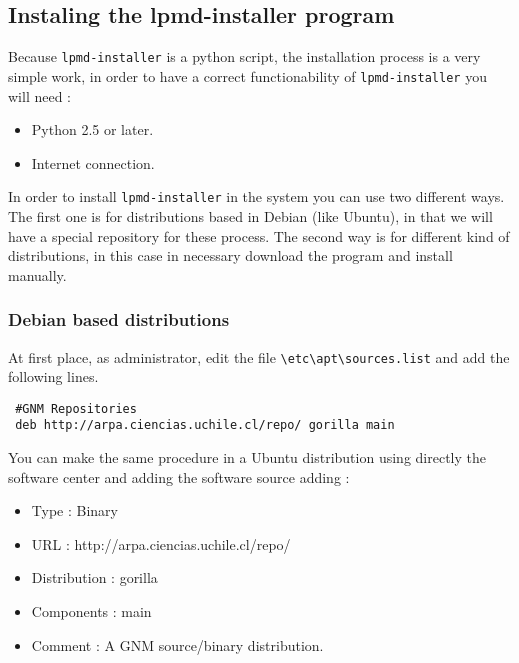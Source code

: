
\subsection{Instaling the lpmd-installer program}

Because \verb|lpmd-installer| is a python script, the installation process is a
very simple work, in order to have a correct functionability of
\verb|lpmd-installer| you will need :

\begin{itemize}
\item Python 2.5 or later.
\item Internet connection.
\end{itemize}

In order to install \verb|lpmd-installer| in the system you can use two
different ways. The first one is for distributions based in Debian (like
Ubuntu), in that we will have a special repository for these process. The
second way is for different kind of distributions, in this case in necessary
download the program and install manually.

\subsubsection{Debian based distributions}

At first place, as administrator, edit the file \verb|\etc\apt\sources.list|
and add the following lines.

\begin{verbatim}
 #GNM Repositories
 deb http://arpa.ciencias.uchile.cl/repo/ gorilla main
\end{verbatim}

You can make the same procedure in a Ubuntu distribution using directly the
software center and adding the software source adding :

\begin{itemize}
 \item Type : Binary
 \item URL : http://arpa.ciencias.uchile.cl/repo/
 \item Distribution : gorilla
 \item Components : main
 \item Comment : A GNM source/binary distribution.
\end{itemize}

